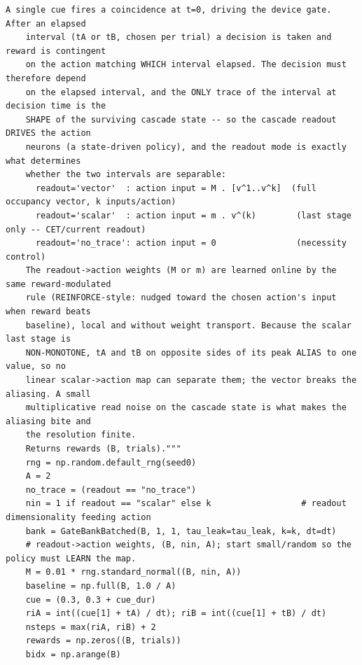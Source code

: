 \begin{lstlisting}[caption={mrl\_trace/selectivity.py},label={lst:siox-src-selectivity}]
    A single cue fires a coincidence at t=0, driving the device gate. After an elapsed
    interval (tA or tB, chosen per trial) a decision is taken and reward is contingent
    on the action matching WHICH interval elapsed. The decision must therefore depend
    on the elapsed interval, and the ONLY trace of the interval at decision time is the
    SHAPE of the surviving cascade state -- so the cascade readout DRIVES the action
    neurons (a state-driven policy), and the readout mode is exactly what determines
    whether the two intervals are separable:
      readout='vector'  : action input = M . [v^1..v^k]  (full occupancy vector, k inputs/action)
      readout='scalar'  : action input = m . v^(k)        (last stage only -- CET/current readout)
      readout='no_trace': action input = 0                (necessity control)
    The readout->action weights (M or m) are learned online by the same reward-modulated
    rule (REINFORCE-style: nudged toward the chosen action's input when reward beats
    baseline), local and without weight transport. Because the scalar last stage is
    NON-MONOTONE, tA and tB on opposite sides of its peak ALIAS to one value, so no
    linear scalar->action map can separate them; the vector breaks the aliasing. A small
    multiplicative read noise on the cascade state is what makes the aliasing bite and
    the resolution finite.
    Returns rewards (B, trials)."""
    rng = np.random.default_rng(seed0)
    A = 2
    no_trace = (readout == "no_trace")
    nin = 1 if readout == "scalar" else k                  # readout dimensionality feeding action
    bank = GateBankBatched(B, 1, 1, tau_leak=tau_leak, k=k, dt=dt)
    # readout->action weights, (B, nin, A); start small/random so the policy must LEARN the map.
    M = 0.01 * rng.standard_normal((B, nin, A))
    baseline = np.full(B, 1.0 / A)
    cue = (0.3, 0.3 + cue_dur)
    riA = int((cue[1] + tA) / dt); riB = int((cue[1] + tB) / dt)
    nsteps = max(riA, riB) + 2
    rewards = np.zeros((B, trials))
    bidx = np.arange(B)


\end{lstlisting}
